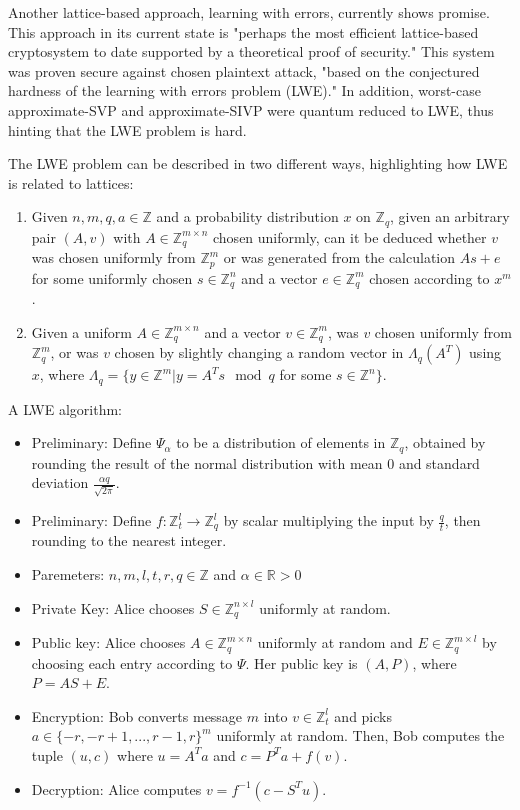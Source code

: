 \documentclass{article}
\begin{document}
Another lattice-based approach, learning with errors, currently shows promise. This approach in its current state is "perhaps the most efficient lattice-based cryptosystem to date supported by a theoretical proof of security." This system was proven secure against chosen plaintext attack, "based on the conjectured hardness of the learning with errors problem (LWE)." In addition, worst-case approximate-SVP and approximate-SIVP were quantum reduced to LWE, thus hinting that the LWE problem is hard.\cite{bernstein09}

The LWE problem can be described in two different ways, highlighting how LWE is related to lattices:\cite{bernstein09}

\begin{enumerate}
	\item Given $ n, m, q, a \in \mathbb{Z} $ and a probability distribution $ x $ on $ \mathbb{Z}_q $, given an arbitrary pair $(A, v)$ with $ A \in \mathbb{Z}^{m \times n}_q $ chosen uniformly, can it be deduced whether $ v $ was chosen uniformly from $ \mathbb{Z}^m_p $ or was generated from the calculation $ A s + e $ for some uniformly chosen $ s \in \mathbb{Z}^n_q $ and a vector $ e \in \mathbb{Z}^m_q $ chosen according to $ x^m $.
	\item Given a uniform $ A \in \mathbb{Z}^{m \times n}_q $ and a vector $ v \in \mathbb{Z}^m_q $, was $ v $ chosen uniformly from $ \mathbb{Z}^m_q $, or was $ v $ chosen by slightly changing a random vector in $ \Lambda_q(A^T) $ using $ x $, where $ \Lambda_q = \{ y \in \mathbb{Z}^m | y = A^Ts \mod q $ for some $ s \in \mathbb{Z}^n \}$.
\end{enumerate}

A LWE algorithm:\cite{bernstein09}

\begin{itemize}
	\item Preliminary: Define $ \Psi_\alpha $ to be a distribution of elements in $ \mathbb{Z}_q $, obtained by rounding the result of the normal distribution with mean 0 and standard deviation $ \frac {\alpha q} {\sqrt{2 \pi}} $.
	\item Preliminary: Define $ f: \mathbb{Z}^l_t \rightarrow \mathbb{Z}^l_q $ by scalar multiplying the input by $ \frac {q} {t} $, then rounding to the nearest integer.
	\item Paremeters: $ n, m, l, t, r, q \in \mathbb{Z} $ and $ \alpha \in \mathbb{R} > 0 $
	\item Private Key: Alice chooses $ S \in \mathbb{Z}^{n \times l}_q $ uniformly at random.
	\item Public key: Alice chooses $ A \in \mathbb{Z}^{m \times n}_q $ uniformly at random and $ E \in \mathbb{Z}^{m \times l}_q $ by choosing each entry according to $ \Psi $. Her public key is $ (A, P) $, where $ P = A S + E $.
	\item Encryption: Bob converts message $ m $ into $ v \in \mathbb{Z}^l_t $ and picks $ a \in \{ -r, -r + 1, ..., r - 1, r \}^m $ uniformly at random. Then, Bob computes the tuple $ (u, c) $ where $ u = A^T a $ and $ c = P^T a + f(v) $.
	\item Decryption: Alice computes $ v = f^{-1}(c - S^T u) $.
\end{itemize}
\end{document}
